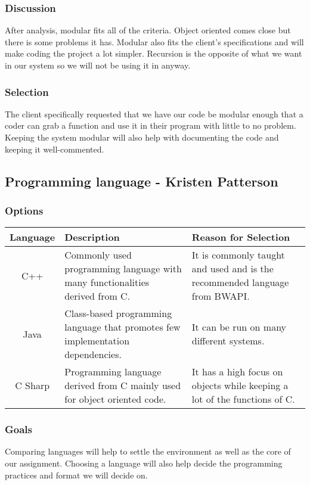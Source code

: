 \subsubsection{Discussion}
After analysis, modular fits all of the criteria. Object oriented comes close but there is some problems it has. Modular also fits the client's specifications and will make coding the project a lot simpler. Recursion is the opposite of what we want in our system so we will not be using it in anyway.

\subsubsection{Selection}
The client specifically requested that we have our code be modular enough that a coder can grab a function and use it in their program with little to no problem. Keeping the system modular will also help with documenting the code and keeping it well-commented.

\subsection{Programming language - Kristen Patterson}
\subsubsection{Options}
\begin{center}
\begin{tabular}{ ||C|L|L|| } 
\hline
Language & Description & Reason for Selection \\
 \hline
 C++ & Commonly used programming language with many functionalities derived from C. & It is commonly taught and used and is the recommended language from BWAPI. \\ 
 \hline
 Java & Class-based programming language that promotes few implementation dependencies. & It can be run on many different systems.\\ 
 \hline
 C Sharp & Programming language derived from C mainly used for object oriented code. & It has a high focus on objects while keeping a lot of the functions of C. \\ 
 \hline
\end{tabular}
\end{center}

\subsubsection{Goals}
Comparing languages will help to settle the environment as well as the core of our assignment. Choosing a language will also help decide the programming practices and format we will decide on.

